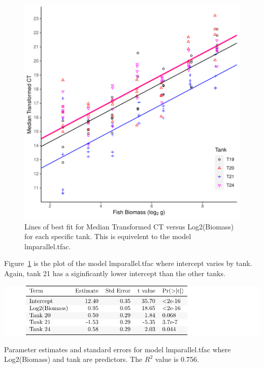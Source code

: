\begin{figure}[H]
\includegraphics{Chapter3Images/parfits.pdf}
\caption{ \hspace{1mm}Lines of best fit for Median Transformed CT versus Log2(Biomass) for each specific tank. This is equivelent to the model  lmparallel.tfac.}
\label{fig:medpar}
\end{figure}

Figure~\ref{fig:medpar} is the plot of the model  lmparallel.tfac where intercept varies by tank. Again, tank 21 has a siginficantly lower intercept than the other tanks.


\vspace{5mm}



 \begin{table}[H]
\includegraphics{Chapter3Images/lmparallelkable.pdf}
\caption{\hspace{1mm}Parameter estimates and standard errors for model  lmparallel.tfac where Log2(Biomass) and tank are predictors. The $R^{2}$ value is 0.756.}
\label{lab:lmparallel}
\end{table}



